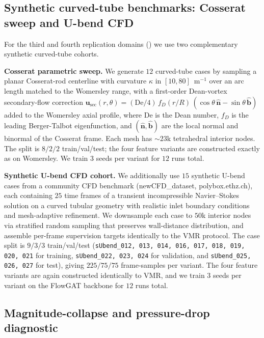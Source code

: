 \documentclass[10pt,a4paper]{article}
\begin{document}
\subsection*{Synthetic curved-tube benchmarks: Cosserat sweep and U-bend CFD}
\label{sec:methods_curved}

For the third and fourth replication domains
() we use two complementary synthetic
curved-tube cohorts.

\textbf{Cosserat parametric sweep.} We generate $12$ curved-tube
cases by sampling a planar Cosserat-rod centerline with curvature
$\kappa$ in $[10, 80]$~m$^{-1}$ over an arc length matched to the
Womersley range, with a first-order Dean-vortex secondary-flow
correction $\mathbf{u}_\mathrm{sec}(r, \theta) = (\mathrm{De}/4)\,
f_D(r/R)\,(\cos\theta\,\hat{\mathbf{n}} - \sin\theta\,\hat{\mathbf{b}})$
added to the Womersley axial profile, where $\mathrm{De}$ is the
Dean number, $f_D$ is the leading Berger-Talbot eigenfunction, and
$(\hat{\mathbf{n}},\hat{\mathbf{b}})$ are the local normal and
binormal of the Cosserat frame. Each mesh has $\sim\!23$k tetrahedral
interior nodes. The split is $8/2/2$ train/val/test; the four feature
variants are constructed exactly as on Womersley. We train $3$ seeds
per variant for $12$ runs total.

\textbf{Synthetic U-bend CFD cohort.} We additionally use $15$
synthetic U-bend cases from a community CFD benchmark
(newCFD\_dataset, polybox.ethz.ch), each containing $25$ time frames
of a transient incompressible Navier--Stokes solution on a curved
tubular geometry with realistic inlet boundary conditions and
mesh-adaptive refinement. We downsample each case to $50$k interior
nodes via stratified random sampling that preserves wall-distance
distribution, and assemble per-frame supervision targets identically
to the VMR protocol. The case split is $9/3/3$ train/val/test
(\texttt{sUbend\_012, 013, 014, 016, 017, 018, 019, 020, 021} for
training, \texttt{sUbend\_022, 023, 024} for validation, and
\texttt{sUbend\_025, 026, 027} for test), giving $225/75/75$
frame-samples per variant. The four feature variants are again
constructed identically to VMR, and we train $3$ seeds per variant
on the FlowGAT backbone for $12$ runs total.

\subsection*{Magnitude-collapse and pressure-drop diagnostic}
\label{sec:methods_dp}
\end{document}

